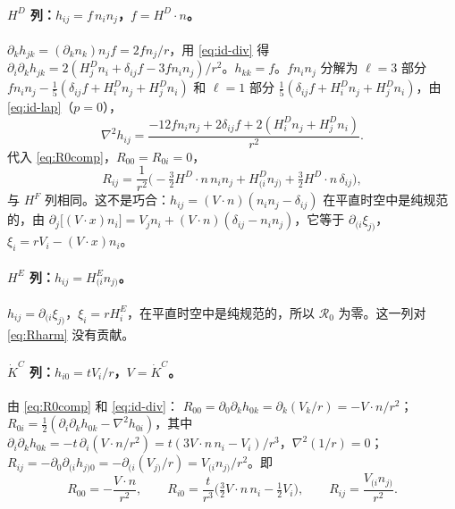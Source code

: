 \documentclass[11pt,a4paper]{ctexart}
\numberwithin{equation}{section}
\begin{document}
\paragraph{$H^D$ 列：$h_{ij}=f\,n_in_j$，$f=H^D\!\cdot n$。}$\partial_kh_{jk}=(\partial_kn_k)n_jf=2fn_j/r$，用 \eqref{eq:id-div} 得 $\partial_i\partial_kh_{jk}=2(H^D_jn_i+\delta_{ij}f-3fn_in_j)/r^2$。$h_{kk}=f$。$fn_in_j$ 分解为 $\ell=3$ 部分 $f n_in_j-\tfrac15(\delta_{ij}f+H^D_in_j+H^D_jn_i)$ 和 $\ell=1$ 部分 $\tfrac15(\delta_{ij}f+H^D_in_j+H^D_jn_i)$，由 \eqref{eq:id-lap}（$p=0$），
\begin{equation*}
\nabla^2h_{ij}=\frac{-12fn_in_j+2\delta_{ij}f+2(H^D_in_j+H^D_jn_i)}{r^2}.
\end{equation*}
代入 \eqref{eq:R0comp}，$R_{00}=R_{0i}=0$，
\begin{equation}
R_{ij}=\frac1{r^2}\Big(-\tfrac32H^D\!\cdot n\,n_in_j+H^D_{(i}n_{j)}+\tfrac32H^D\!\cdot n\,\delta_{ij}\Big),
\end{equation}
与 $H^F$ 列相同。这不是巧合：$h_{ij}=(V\!\cdot n)(n_in_j-\delta_{ij})$ 在平直时空中是纯规范的，由 $\partial_j\big[(V\!\cdot x)n_i\big]=V_jn_i+(V\!\cdot n)(\delta_{ij}-n_in_j)$，它等于 $\partial_{(i}\xi_{j)}$，$\xi_i=rV_i-(V\!\cdot x)n_i$。

\paragraph{$H^E$ 列：$h_{ij}=H^E_{(i}n_{j)}$。}$h_{ij}=\partial_{(i}\xi_{j)}$，$\xi_i=rH^E_i$，在平直时空中是纯规范的，所以 $\mathcal R_0$ 为零。这一列对 \eqref{eq:Rharm} 没有贡献。

\paragraph{$\dot K^C$ 列：$h_{i0}=tV_i/r$，$V=\dot K^C$。}由 \eqref{eq:R0comp} 和 \eqref{eq:id-div}：
$R_{00}=\partial_0\partial_kh_{0k}=\partial_k(V_k/r)=-V\!\cdot n/r^2$；
$R_{0i}=\tfrac12(\partial_i\partial_kh_{0k}-\nabla^2h_{0i})$，其中 $\partial_i\partial_kh_{0k}=-t\,\partial_i(V\!\cdot n/r^2)=t(3V\!\cdot n\,n_i-V_i)/r^3$，$\nabla^2(1/r)=0$；
$R_{ij}=-\partial_0\partial_{(i}h_{j)0}=-\partial_{(i}(V_{j)}/r)=V_{(i}n_{j)}/r^2$。即
\begin{equation}
R_{00}=-\frac{V\!\cdot n}{r^2},\qquad R_{i0}=\frac t{r^3}\Big(\tfrac32V\!\cdot n\,n_i-\tfrac12V_i\Big),\qquad R_{ij}=\frac{V_{(i}n_{j)}}{r^2}.
\end{equation}
\end{document}
